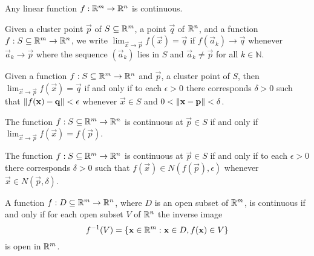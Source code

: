 \documentclass{article}
\begin{document}
\begin{corollary}
    Any linear function $f: \mathbb{R}^m \rightarrow \mathbb{R}^n$ is continuous.
\end{corollary}

\begin{definition}[Limit]
    Given a cluster point $\vec{p}$ of $S \subseteq \mathbb{R}^m$, a point $\vec{q}$ of $\mathbb{R}^n$,
    and a function ${f: S \subseteq \mathbb{R}^m \rightarrow \mathbb{R}^n}$, we write
    ${\lim_{\vec{x} \rightarrow \vec{p}} f(\vec{x})} = \vec{q}$
    if $f(\vec{a}_k) \rightarrow \vec{q}$ whenever $\vec{a}_k \rightarrow \vec{p}$ where the sequence
    $(\vec{a}_k)$ lies in $S$ and $\vec{a}_k \neq \vec{p}$ for all $k \in \mathbb{N}$.
\end{definition}

\begin{theorem}
    Given a function ${f: S \subseteq \mathbb{R}^m \rightarrow \mathbb{R}^n}$ and $\vec{p}$, a cluster point of $S$,
    then $\lim_{\vec{x} \rightarrow \vec{p}} f(\vec{x}) = \vec{q}$ if and only if to each $\epsilon > 0$ there corresponds
    $\delta > 0$ such that $\lVert f(\mathbf{x}) - \mathbf{q}\rVert < \epsilon$ whenever $\vec{x} \in S$ and
    $0 < \lVert\mathbf{x} - \mathbf{p}\rVert < \delta$.
\end{theorem}

\begin{theorem}
    The function ${f: S \subseteq \mathbb{R}^m \rightarrow \mathbb{R}^n}$ is continuous at $\vec{p} \in S$
    if and only if  $\lim_{\vec{x} \rightarrow \vec{p}} f(\vec{x}) = f(\vec{p})$.
\end{theorem}

\begin{theorem}
    The function ${f: S \subseteq \mathbb{R}^m \rightarrow \mathbb{R}^n}$ is continuous at $\vec{p} \in S$
    if and only if to each $\epsilon > 0$ there corresponds $\delta > 0$ such that $f(\vec{x}) \in N(f(\vec{p}), \epsilon)$
    whenever $\vec{x} \in N(\vec{p}, \delta)$.
\end{theorem}

\begin{theorem}
    A function ${f: D \subseteq \mathbb{R}^m \rightarrow \mathbb{R}^n}$, where $D$ is an
    open subset of $\mathbb{R}^m$, is continuous if and only if for each open subset $V$
    of $\mathbb{R}^n$ the inverse image
    \begin{equation*}
        f^{-1}(V) = \{\mathbf{x} \in \mathbb{R}^m : \mathbf{x} \in D, f(\mathbf{x}) \in V\}
    \end{equation*}
    is open in $\mathbb{R}^m$.
\end{theorem}
\end{document}
